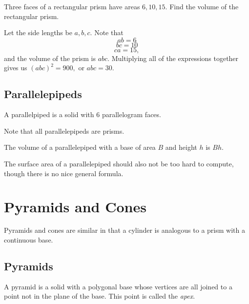 \begin{exam}
Three faces of a rectangular prism have areas $6,10,15.$ Find the volume of the rectangular prism.
\end{exam}
\begin{sol}
Let the side lengths be $a,b,c.$ Note that
\[ab=6\]
\[bc=10\]
\[ca=15,\]
and the volume of the prism is $abc.$ Multiplying all of the expressions together gives us $(abc)^2=900,$ or $abc=30.$
\end{sol}

\subsection{Parallelepipeds}

\begin{defi}[Parallelepipeds]
A parallelpiped is a solid with $6$ parallelogram faces.
\begin{center}
\end{center}
\end{defi}
Note that all parallelepipeds are prisms.

\begin{theo}
The volume of a parallelepiped with a base of area $B$ and height $h$ is $Bh.$
\end{theo}
The surface area of a parallelepiped should also not be too hard to compute, though there is no nice general formula.

\section{Pyramids and Cones}
Pyramids and cones are similar in that a cylinder is analogous to a prism with a continuous base.

\subsection{Pyramids}

\begin{defi}
A pyramid is a solid with a polygonal base whose vertices are all joined to a point not in the plane of the base. This point is called the \textit{apex}.
\begin{center}
\end{center}
\end{defi}

